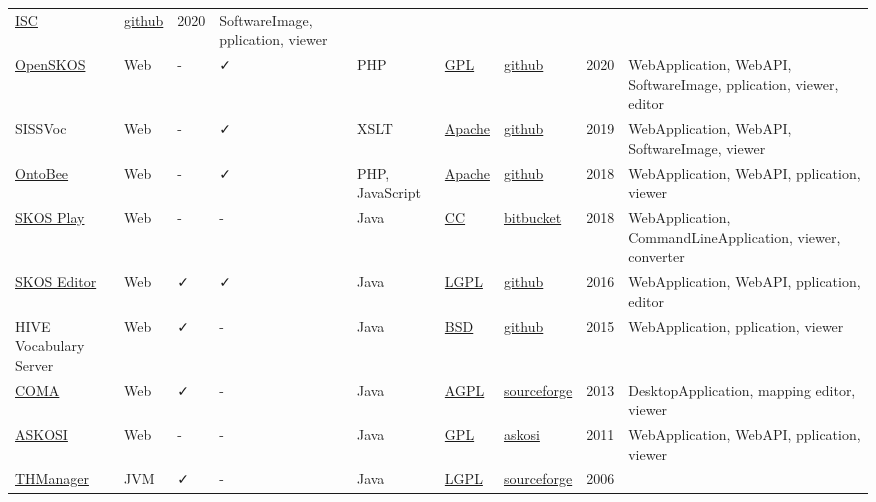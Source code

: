 \documentclass[
  DIV=10]{article}
\begin{document}
\begin{longtable}[]{@{}lllllllll@{}}
\href{https://spdx.org/licenses/ISC}{ISC} &
\href{https://github.com/essepuntato/LODE}{github} & 2020 &
SoftwareImage, pplication, viewer \\
\href{http://openskos.org/}{OpenSKOS} & Web & - & ✓ & PHP &
\href{https://spdx.org/licenses/GPL-3.0-or-later}{GPL} &
\href{https://github.com/OpenSKOS/OpenSKOS}{github} & 2020 &
WebApplication, WebAPI, SoftwareImage, pplication, viewer, editor \\
SISSVoc & Web & - & ✓ & XSLT &
\href{https://spdx.org/licenses/Apache-2.0}{Apache} &
\href{https://github.com/SISS/sissvoc}{github} & 2019 & WebApplication,
WebAPI, SoftwareImage, viewer \\
\href{https://ontobee.org/}{OntoBee} & Web & - & ✓ & PHP, JavaScript &
\href{https://spdx.org/licenses/Apache-2.0}{Apache} &
\href{https://github.com/OntoZoo/ontobee}{github} & 2018 &
WebApplication, WebAPI, pplication, viewer \\
\href{https://skos-play.sparna.fr/play/about}{SKOS Play} & Web & - & - &
Java & \href{https://spdx.org/licenses/CC-BY-SA-4.0}{CC} &
\href{https://bitbucket.org/tfrancart/sparna/src/master/}{bitbucket} &
2018 & WebApplication, CommandLineApplication, viewer, converter \\
\href{https://jbiomedsem.biomedcentral.com/articles/10.1186/s13326-015-0043-z}{SKOS
Editor} & Web & ✓ & ✓ & Java &
\href{https://spdx.org/licenses/LGPL-3.0-or-later}{LGPL} &
\href{https://github.com/Blulab-Utah/SKOSEditor}{github} & 2016 &
WebApplication, WebAPI, pplication, editor \\
HIVE Vocabulary Server & Web & ✓ & - & Java &
\href{https://spdx.org/licenses/BSD-3-Clause}{BSD} &
\href{https://github.com/MetadataResearchCenter/hive-mrc}{github} & 2015
& WebApplication, pplication, viewer \\
\href{https://sourceforge.net/projects/coma-ce/files/}{COMA} & Web & ✓ &
- & Java & \href{https://spdx.org/licenses/AGPL-3.0-or-later}{AGPL} &
\href{https://sourceforge.net/projects/coma-ce/}{sourceforge} & 2013 &
DesktopApplication, mapping editor, viewer \\
\href{http://www.askosi.org/}{ASKOSI} & Web & - & - & Java &
\href{https://spdx.org/licenses/GPL-3.0-or-later}{GPL} &
\href{http://www.askosi.org/example/}{askosi} & 2011 & WebApplication,
WebAPI, pplication, viewer \\
\href{https://thmanager.sourceforge.io/}{THManager} & JVM & ✓ & - & Java
& \href{https://spdx.org/licenses/LGPL-3.0-or-later}{LGPL} &
\href{https://sourceforge.net/projects/thmanager/}{sourceforge} & 2006 &

\end{longtable}
\end{document}
